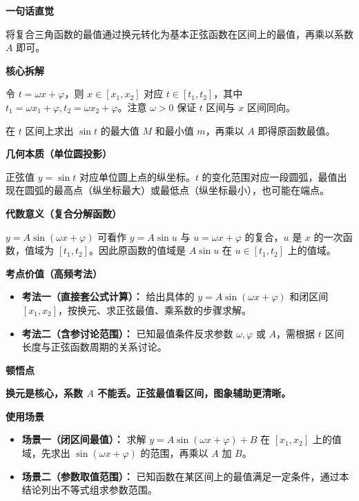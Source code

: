 \begin{explanationbox}
	\textbf{\textcolor{CExplanation}{一句话直觉}}

	将复合三角函数的最值通过换元转化为基本正弦函数在区间上的最值，再乘以系数 $A$ 即可。

	\medskip
	\textbf{\textcolor{CExplanation}{核心拆解}}
	\begin{description}[style=nextline, leftmargin=2.8em, labelsep=0.5em, itemsep=0.45em]
		\item[\textbf{要点一（换元定范围）：}] 令 $t=\omega x+\varphi$，则 $x\in[x_1,x_2]$ 对应 $t\in[t_1,t_2]$，其中 $t_1=\omega x_1+\varphi,t_2=\omega x_2+\varphi$。注意 $\omega>0$ 保证 $t$ 区间与 $x$ 区间同向。
		\item[\textbf{要点二（正弦最值）：}] 在 $t$ 区间上求出 $\sin t$ 的最大值 $M$ 和最小值 $m$，再乘以 $A$ 即得原函数最值。
	\end{description}

	\medskip
	\textbf{\textcolor{CExplanation}{几何本质（单位圆投影）}}

	正弦值 $y=\sin t$ 对应单位圆上点的纵坐标。$t$ 的变化范围对应一段圆弧，最值出现在圆弧的最高点（纵坐标最大）或最低点（纵坐标最小），也可能在端点。

	\medskip
	\textbf{\textcolor{CExplanation}{代数意义（复合分解函数）}}

	$y=A\sin(\omega x+\varphi)$ 可看作 $y=A\sin u$ 与 $u=\omega x+\varphi$ 的复合，$u$ 是 $x$ 的一次函数，值域为 $[t_1,t_2]$。因此原函数的值域是 $A\sin u$ 在 $u\in[t_1,t_2]$ 上的值域。

	\medskip
	\textbf{\textcolor{CExplanation}{考点价值（高频考法）}}
	\begin{itemize}[leftmargin=*, itemsep=0.5em, topsep=0.4em]
		\item \textbf{考法一（直接套公式计算）：} 给出具体的 $y=A\sin(\omega x+\varphi)$ 和闭区间 $[x_1,x_2]$，按换元、求正弦最值、乘系数的步骤求解。
		\item \textbf{考法二（含参讨论范围）：} 已知最值条件反求参数 $\omega,\varphi$ 或 $A$，需根据 $t$ 区间长度与正弦函数周期的关系讨论。
	\end{itemize}

	\medskip
	\textbf{\textcolor{CExplanation}{顿悟点}}

	\textbf{换元是核心，系数 $A$ 不能丢。正弦最值看区间，图象辅助更清晰。}

	\medskip
	\textbf{\textcolor{CExplanation}{使用场景}}
	\begin{itemize}[leftmargin=*, itemsep=0.5em, topsep=0.4em]
		\item \textbf{场景一（闭区间最值）：} 求解 $y=A\sin(\omega x+\varphi)+B$ 在 $[x_1,x_2]$ 上的值域，先求出 $\sin(\omega x+\varphi)$ 的范围，再乘以 $A$ 加 $B$。
		\item \textbf{场景二（参数取值范围）：} 已知函数在某区间上的最值满足一定条件，通过本结论列出不等式组求参数范围。
	\end{itemize}
\end{explanationbox}
